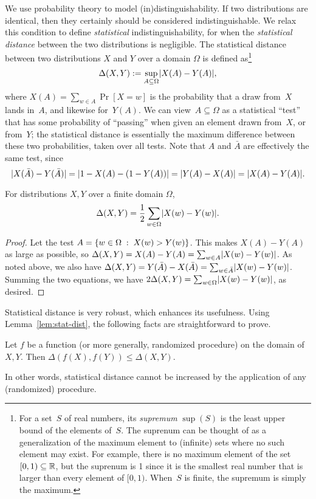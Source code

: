\documentclass[11pt]{article}
\begin{document}
We use probability theory to model (in)distinguishability.  If two
distributions are identical, then they certainly should be considered
indistinguishable.  We relax this condition to define
\emph{statistical} indistinguishability, for when the
\emph{statistical distance} between the two distributions is
negligible.  The statistical distance between two distributions $X$
and $Y$ over a domain $\Omega$ is defined as\footnote{For a set~$S$ of
  real numbers, its \emph{supremum} $\sup(S)$ is the least upper bound
  of the elements of~$S$. The suprenum can be thought of as a
  generalization of the maximum element to (infinite) sets where no
  such element may exist. For example, there is no maximum element of
  the set $[0,1) \subseteq \mathbb{R}$, but the suprenum is 1 since it is the
  smallest real number that is larger than every element of
  $[0,1)$. When~$S$ is finite, the supremum is simply the maximum.}
\[ \Delta(X,Y) := \sup_{A \subseteq \Omega} \lvert X(A) - Y(A)\rvert, \]
where $X(A) = \sum_{w \in A} \Pr[X=w]$ is the probability that a draw
from~$X$ lands in~$A$, and likewise for~$Y(A)$. We can
view~$A \subseteq \Omega$ as a statistical ``test'' that has some
probability of ``passing'' when given an element drawn from~$X$, or
from~$Y$; the statistical distance is essentially the maximum
difference between these two probabilities, taken over all tests.
Note that $A$ and $\bar{A}$ are effectively the same test, since
\[ \lvert X(\bar{A})-Y(\bar{A})\rvert = \lvert1-X(A)-(1-Y(A))\rvert =
  \lvert Y(A)-X(A)\rvert = \lvert X(A)-Y(A)\rvert. \]

\begin{lemma}
  \label{lem:stat-dist}
  For distributions $X,Y$ over a finite domain $\Omega$,
  \[ \Delta(X,Y) = \frac12 \sum_{w \in \Omega} \lvert X(w) - Y(w)\rvert. \]
\end{lemma}

\begin{proof}
  Let the test $A = \{w \in \Omega\; :\; X(w) > Y(w)\}$.  This makes
  $X(A) - Y(A)$ as large as possible, so
  $\Delta(X,Y) = X(A)-Y(A) = \sum_{w \in A} \lvert X(w)-Y(w)\rvert$.  As
  noted above, we also have
  $\Delta(X,Y) = Y(\bar{A})-X(\bar{A}) = \sum_{w \in \bar{A}}
  \lvert X(w)-Y(w)\rvert$.  Summing the two equations, we have
  $2\Delta(X,Y) = \sum_{w \in \Omega} \lvert X(w)-Y(w)\rvert$, as desired.
\end{proof}

Statistical distance is very robust, which enhances its usefulness.
Using Lemma~\ref{lem:stat-dist}, the following facts are
straightforward to prove.

\begin{lemma}
  Let $f$ be a function (or more generally, randomized procedure) on
  the domain of $X,Y$. Then $\Delta(f(X), f(Y)) \leq \Delta(X,Y)$.
\end{lemma}
In other words, statistical distance cannot be increased by the
application of any (randomized) procedure.
\end{document}
